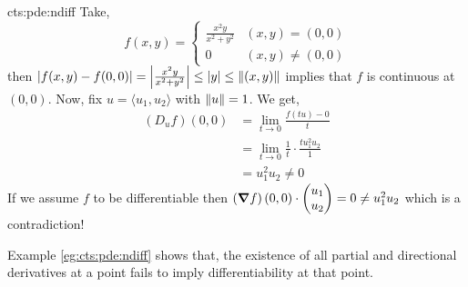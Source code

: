 \documentclass[../Analysis-3.tex]{subfiles}
\begin{document}
\begin{Eg}{}{cts:pde:ndiff}
  Take,
  \[ f(x,y) = \begin{cases}
      \frac{x^2y}{x^2+y^2} & (x,y) = (0,0)     \\
      0                    & (x,y) \not= (0,0)
    \end{cases} \]
  then $ \left| f(x,y) - f(0,0) \right| = \left| \frac{x^2y}{x^2+y^2} \right| \leq |y| \leq \norm{(x,y)} $ implies that $ f $ is continuous at $ (0,0) $. Now, fix $ u = \langle u_1, u_2 \rangle $ with $ \norm{u} = 1 $. We get,
  \begin{align*}
    \left( D_uf \right)(0,0)
     & = \lim_{t\to 0} \frac{f(tu)- 0}{t}                        \\
     & =\lim_{t\to 0} \frac{1}{t}\cdot\frac{tu_1^2u_2}{1}        \\
     & = u_1^2u_2 \not= 0 \tag{Because, $ u $ is an unit vector}
  \end{align*}
  If we assume $ f $ to be differentiable then $ \left( \grad f \right)(0,0) \cdot \begin{pmatrix} u_1 \\ u_2  \end{pmatrix} = 0 \not= u_1^2u_2 $ which is a contradiction!
\end{Eg}

Example \ref{eg:cts:pde:ndiff} shows that, the existence of all partial and directional derivatives at a point fails to imply differentiability at that point.
\end{document}
